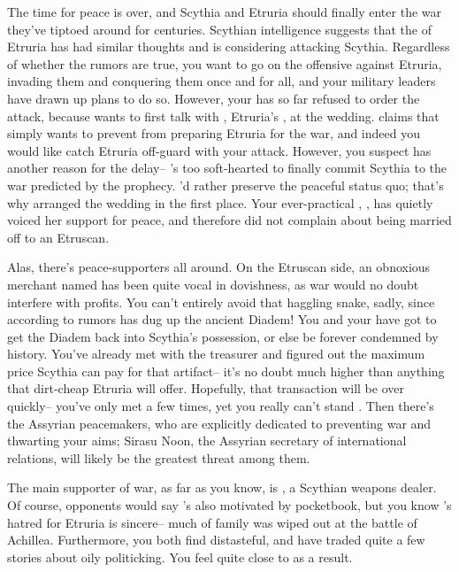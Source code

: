 \documentclass[char]{Kos}
\begin{document}
The time for peace is over, and Scythia and Etruria should finally enter the war they've tiptoed around for centuries. Scythian intelligence suggests that the \cEtruriaKing{\monarch} of Etruria has had similar thoughts and is considering attacking Scythia. Regardless of whether the rumors are true, you want to go on the offensive against Etruria, invading them and conquering them once and for all, and your military leaders have drawn up plans to do so. However, your \cScythiaKing{\spouse} has so far refused to order the attack, because \cScythiaKing{\they} wants to first talk with \cEtruriaKing{}, Etruria's \cEtruriaKing{\monarch}, at the wedding. \cScythiaKing{\They} claims that \cScythiaKing{\they} simply wants to prevent \cEtruriaKing{} from preparing Etruria for the war, and indeed you would like catch Etruria off-guard with your attack. However, you suspect \cScythiaKing{} has another reason for the delay-- \cScythiaKing{\they}'s too soft-hearted to finally commit Scythia to the war predicted by the prophecy. \cScythiaKing{\They}'d rather preserve the peaceful status quo; that's why \cScythiaKing{\they} arranged the wedding in the first place. Your ever-practical \cBride{\offspring}, \cBride{}, has quietly voiced her support for peace, and \cBride{\they} therefore did not complain about being married off to an Etruscan. 

Alas, there's peace-supporters all around. On the Etruscan side, an obnoxious merchant named \cMerchant{} has been quite vocal in \cMerchant{\their} dovishness, as war would no doubt interfere with \cMerchant{\their} profits. You can't entirely avoid that haggling snake, sadly, since according to rumors \cMerchant{\they} has dug up the ancient Diadem! You and your \cScythiaKing{\spouse} have got to get the Diadem back into Scythia's possession, or else be forever condemned by history. You've already met with the treasurer and figured out the maximum price Scythia can pay \cMerchant{} for that artifact-- it's no doubt much higher than anything that dirt-cheap Etruria will offer. Hopefully, that transaction will be over quickly-- you've only met \cMerchant{} a few times, yet you really can't stand \cMerchant{\them}. Then there's the Assyrian peacemakers, who are explicitly dedicated to preventing war and thwarting your aims; Sirasu Noon, the Assyrian secretary of international relations, will likely be the greatest threat among them.

The main supporter of war, as far as you know, is \cArmsDealer{}, a Scythian weapons dealer. Of course, \cArmsDealer{\their} opponents would say \cArmsDealer{\they}'s also motivated by \cArmsDealer{\their} pocketbook, but you know \cArmsDealer{}'s hatred for Etruria is sincere-- much of \cArmsDealer{\their} family was wiped out at the battle of Achillea. Furthermore, you both find \cMerchant{} distasteful, and have traded quite a few stories about \cMerchant{\their} oily politicking. You feel quite close to \cArmsDealer{} as a result. 
\end{document}

